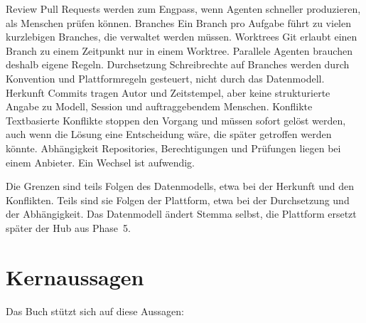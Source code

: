 \startplacetable[title={Grenzen im agentischen Kontext},reference=tab:limits,location=split]
\startxtable[frame=off,split=yes,option=stretch]
\startxtablehead
\startxrow[topframe=on,bottomframe=on]
 \stopxcell
{} \stopxcell
\stopxrow
\stopxtablehead
\startxtablenext
\startxrow[topframe=on,bottomframe=on]
 \stopxcell
{} \stopxcell
\stopxrow
\stopxtablenext
\startxrow
\startxcell Review \stopxcell
\startxcell Pull Requests werden zum Engpass, wenn Agenten schneller produzieren,
als Menschen prüfen können. \stopxcell
\stopxrow
\startxrow
\startxcell Branches \stopxcell
\startxcell Ein Branch pro Aufgabe führt zu vielen kurzlebigen Branches,
die verwaltet werden müssen. \stopxcell
\stopxrow
\startxrow
\startxcell Worktrees \stopxcell
\startxcell Git erlaubt einen Branch zu einem Zeitpunkt nur in einem Worktree.
Parallele Agenten brauchen deshalb eigene Regeln. \stopxcell
\stopxrow
\startxrow
\startxcell Durchsetzung \stopxcell
\startxcell Schreibrechte auf Branches werden durch Konvention und Plattformregeln gesteuert,
nicht durch das Datenmodell. \stopxcell
\stopxrow
\startxrow
\startxcell Herkunft \stopxcell
\startxcell Commits tragen Autor und Zeitstempel, aber keine strukturierte Angabe zu Modell,
Session und auftraggebendem Menschen. \stopxcell
\stopxrow
\startxrow
\startxcell Konflikte \stopxcell
\startxcell Textbasierte Konflikte stoppen den Vorgang und müssen sofort gelöst werden,
auch wenn die Lösung eine Entscheidung wäre, die später getroffen werden könnte. \stopxcell
\stopxrow
\startxrow[topframe=on,bottomframe=on]
\startxcell Abhängigkeit \stopxcell
\startxcell Repositories, Berechtigungen und Prüfungen liegen bei einem Anbieter.
Ein Wechsel ist aufwendig. \stopxcell
\stopxrow
\stopxtable
\stopplacetable

Die Grenzen sind teils Folgen des Datenmodells, etwa bei der Herkunft und den Konflikten.
Teils sind sie Folgen der Plattform, etwa bei der Durchsetzung und der Abhängigkeit.
Das Datenmodell ändert Stemma selbst, die Plattform ersetzt später der Hub aus Phase~5.

\section{Kernaussagen}

Das Buch stützt sich auf diese Aussagen:

